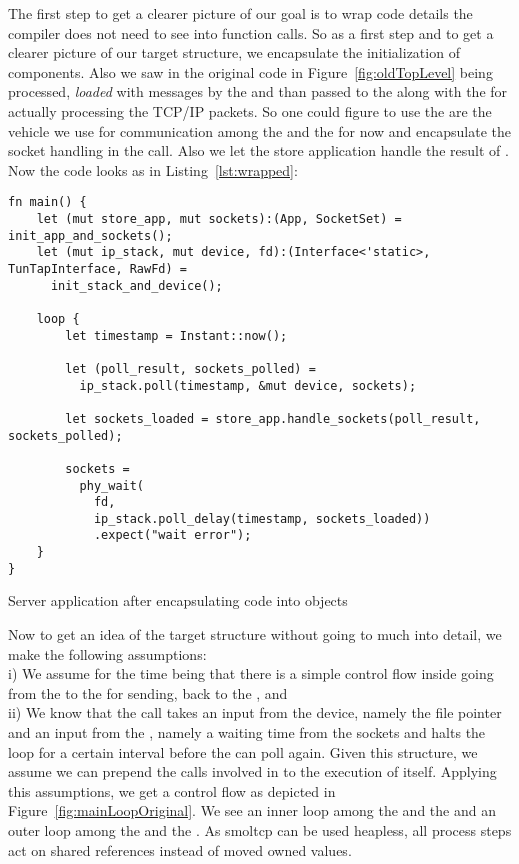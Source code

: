 The first step to get a clearer picture of our goal is to wrap code details the compiler does not need to see into function calls. So as a first step and to get a clearer picture of our target structure, we encapsulate the initialization of components. Also we saw in the original code in Figure~\ref{fig:oldTopLevel}  being processed, \emph{loaded} with messages by the  and than passed to the  along with the  for actually processing the TCP/IP packets. So one could figure to use the  are the vehicle we use for communication among the  and the  for now and encapsulate the socket handling in the  call. Also we let the store application handle the result of . 
Now the code looks as in Listing~\ref{lst:wrapped}:
\begin{codefigure}
\begin{verbatim}
fn main() {
    let (mut store_app, mut sockets):(App, SocketSet) = init_app_and_sockets();
    let (mut ip_stack, mut device, fd):(Interface<'static>, TunTapInterface, RawFd) = 
      init_stack_and_device();

    loop {
        let timestamp = Instant::now();
        
        let (poll_result, sockets_polled) = 
          ip_stack.poll(timestamp, &mut device, sockets);

        let sockets_loaded = store_app.handle_sockets(poll_result, sockets_polled);

        sockets = 
          phy_wait(
            fd, 
            ip_stack.poll_delay(timestamp, sockets_loaded))
            .expect("wait error");
    }
}
\end{verbatim}
\caption{Server application after encapsulating code into objects}
\label{lst:wrapped}
\end{codefigure}


Now to get an idea of the target structure without going to much into detail, we make the following assumptions: \\

i) We assume for the time being that there is a simple control flow inside  going from the  to the  for sending, back to the , and\\

ii) We know that the  call takes an input from the device, namely the file pointer  and an input from the , namely a waiting time from the sockets and halts the loop for a certain interval before the  can poll again. Given this structure, we assume we can prepend the calls involved in  to the execution of  itself. 
Applying this assumptions, we get a control flow as depicted in Figure~\ref{fig:mainLoopOriginal}. We see an inner loop among the  and the  and an outer loop among the  and the . As smoltcp can be used heapless, all process steps act on shared references instead of moved owned values.

